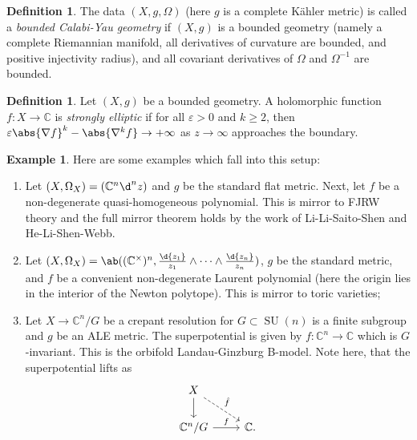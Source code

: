 \documentclass{amsart}
\theoremstyle{definition}
\newtheorem{defn}[thm]{Definition}
\newtheorem{exm}[thm]{Example}
\theoremstyle{remark}
\theoremstyle{plain}
\theoremstyle{definition}
\theoremstyle{remark}
\newcommand{\C}{\mathbb{C}}
\newcommand{\ep}{\varepsilon}
\newcommand{\on}[1]{\operatorname{#1}}
\newcommand{\1}{\mathbf{1}}
\newcommand{\2}{\mathbf{2}}
\newcommand{\3}{\mathbf{3}}
\begin{document}
\begin{defn}
    The data \((X, g, \Omega)\) (here \(g\) is a complete K\"ahler metric) is called a \textit{bounded Calabi-Yau geometry} if \((X, g)\) is a bounded geometry (namely a complete Riemannian manifold, all derivatives of curvature are bounded, and positive injectivity radius), and all covariant derivatives of \(\Omega\) and \(\Omega^{-1}\) are bounded.
\end{defn}

\begin{defn}
    Let \((X, g)\) be a bounded geometry. A holomorphic function \(f \colon X \to \C\) is \textit{strongly elliptic} if for all \(\ep > 0\) and \(k \geq 2\), then \(\ep \abs{\nabla f}^k - \abs{\nabla^k f} \to +\infty\) as \(z \to \infty\) approaches the boundary.
\end{defn}

\begin{exm}
    Here are some examples which fall into this setup:
    \begin{enumerate}
        \item Let \((X, \Omega_X) = (\C^n \d^n z)\) and \(g\) be the standard flat metric. Next, let \(f\) be a non-degenerate quasi-homogeneous polynomial. This is mirror to FJRW theory and the full mirror theorem holds by the work of Li-Li-Saito-Shen and He-Li-Shen-Webb.
        \item Let \((X, \Omega_X) = \ab((\C^{\times})^n, \frac{\d{z_1}}{z_1} \wedge \cdots \wedge \frac{\d{z_n}}{z_n})\), \(g\) be the standard metric, and \(f\) be a convenient non-degenerate Laurent polynomial (here the origin lies in the interior of the Newton polytope). This is mirror to toric varieties;
        \item Let \(X \to \C^n / G\) be a crepant resolution for \(G \subset \on{SU}(n)\) is a finite subgroup and \(g\) be an ALE metric. The superpotential is given by \(f \colon \C^n \to \C\) which is \(G\)-invariant. This is the orbifold Landau-Ginzburg B-model. Note here, that the superpotential lifts as
        \begin{equation*}
        \begin{tikzcd}
            X \ar{d} \ar[dashed]{dr}{\hat{f}} \\
            \C^n / G \ar{r}{f} & \C.
        \end{tikzcd}
        \end{equation*}
    \end{enumerate}
\end{exm}
\end{document}
